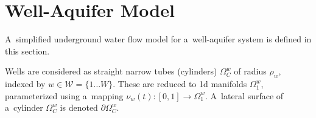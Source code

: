 \section{Well-Aquifer Model}
A~simplified underground water flow model for a~well-aquifer system is defined in this section.

Wells are considered as straight narrow tubes (cylinders) $\Omega^w_C$ of radius $\rho_w$,
indexed by $w\in\mathcal{W}=\{1\ldots W\}$. These are reduced to 1d manifolds
$\Omega^w_1$, parameterized using a~mapping $\nu_w(t): [0,1] \rightarrow \Omega^w_1$.
A~lateral surface of a~cylinder $\Omega^w_C$ is denoted $\partial\Omega^w_C$.



